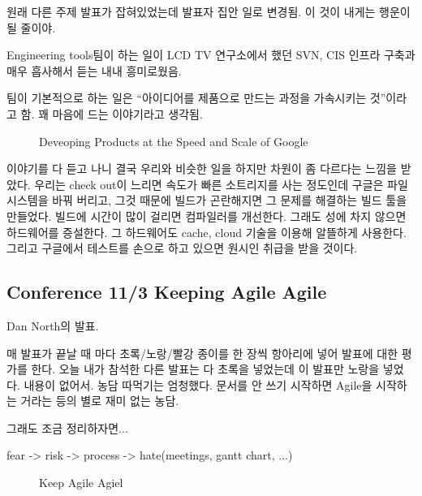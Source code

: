 \documentclass[a4paper]{article}
\begin{document}
원래 다른 주제 발표가 잡혀있었는데 발표자 집안 일로 변경됨. 이 것이
내게는 행운이 될 줄이야.
 
Engineering tools팀이 하는 일이 LCD TV 연구소에서 했던 SVN, CIS 인프라
구축과 매우 흡사해서 듣는 내내 흥미로웠음.
 
팀이 기본적으로 하는 일은 ``아이디어를 제품으로 만드는 과정을 가속시키는
것''이라고 함. 꽤 마음에 드는 이야기라고 생각됨.

\begin{figure}[t]
    \begin{Frame}
        \begin{center}
        \end{center}
    \end{Frame}
    \caption{Deveoping Products at the Speed and Scale of Google}
    \label{google}
\end{figure}
 
이야기를 다 듣고 나니 결국 우리와 비슷한 일을 하지만 차원이 좀 다르다는
느낌을 받았다. 우리는 check out이 느리면 속도가 빠른 소트리지를 사는
정도인데 구글은 파일시스템을 바꿔 버리고, 그것 때문에 빌드가 곤란해지면
그 문제를 해결하는 빌드 툴을 만들었다. 빌드에 시간이 많이 걸리면
컴파일러를 개선한다. 그래도 성에 차지 않으면 하드웨어를 증설한다. 그
하드웨어도 cache, cloud 기술을 이용해 알뜰하게 사용한다. 그리고
구글에서 테스트를 손으로 하고 있으면 원시인 취급을 받을 것이다.

\subsection{Conference 11/3 Keeping Agile Agile}
 
Dan North의 발표.  

매 발표가 끝날 때 마다 초록/노랑/빨강 종이를 한 장씩 항아리에 넣어
발표에 대한 평가를 한다.  오늘 내가 참석한 다른 발표는 다 초록을
넣었는데 이 발표만 노랑을 넣었다.  내용이 없어서. 농담 따먹기는 엄청했다. 
문서를 안 쓰기 시작하면 Agile을 시작하는 거라는 등의 별로 재미 없는 농담.
 
그래도 조금 정리하자면...

\begin{center}
fear -> risk -> process -> hate(meetings, gantt chart, ...)
\end{center}

\begin{figure}[t]
    \begin{Frame}
        \begin{center}
        \end{center}
    \end{Frame}
    \caption{Keep Agile Agiel}
    \label{agile agile}
\end{figure}
\end{document}
